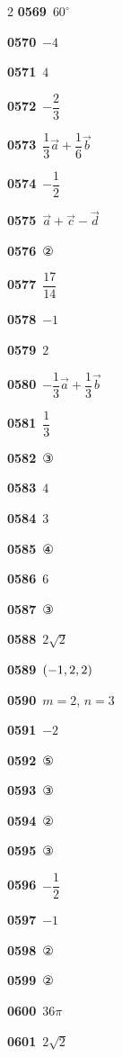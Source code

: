 \documentclass[10pt,a4paper]{article}
\begin{document}
\begin{multicols}{2}
\noindent\textbf{0569}\ $60^\circ$\par
\noindent\textbf{0570}\ $-4$\par
\noindent\textbf{0571}\ $4$\par
\noindent\textbf{0572}\ $-\dfrac{2}{3}$\par
\noindent\textbf{0573}\ $\dfrac{1}{3}\vec{a}+\dfrac{1}{6}\vec{b}$\par
\noindent\textbf{0574}\ $-\dfrac{1}{2}$\par
\noindent\textbf{0575}\ $\vec{a}+\vec{c}-\vec{d}$\par
\noindent\textbf{0576}\ ②\par
\noindent\textbf{0577}\ $\dfrac{17}{14}$\par
\noindent\textbf{0578}\ $-1$\par
\noindent\textbf{0579}\ $2$\par
\noindent\textbf{0580}\ $-\dfrac{1}{3}\vec{a}+\dfrac{1}{3}\vec{b}$\par
\noindent\textbf{0581}\ $\dfrac{1}{3}$\par
\noindent\textbf{0582}\ ③\par
\noindent\textbf{0583}\ $4$\par
\noindent\textbf{0584}\ $3$\par
\noindent\textbf{0585}\ ④\par
\noindent\textbf{0586}\ $6$\par
\noindent\textbf{0587}\ ③\par
\noindent\textbf{0588}\ $2\sqrt{2}$\par
\noindent\textbf{0589}\ $(-1{,}\mkern3mu\mathopen{}2{,}\mkern3mu\mathopen{}2)$\par
\noindent\textbf{0590}\ $m=2$, $n=3$\par
\noindent\textbf{0591}\ $-2$\par
\noindent\textbf{0592}\ ⑤\par
\noindent\textbf{0593}\ ③\par
\noindent\textbf{0594}\ ②\par
\noindent\textbf{0595}\ ③\par
\noindent\textbf{0596}\ $-\dfrac{1}{2}$\par
\noindent\textbf{0597}\ $-1$\par
\noindent\textbf{0598}\ ②\par
\noindent\textbf{0599}\ ②\par
\noindent\textbf{0600}\ $36\pi$\par
\noindent\textbf{0601}\ $2\sqrt{2}$\par

\end{multicols}
\end{document}
